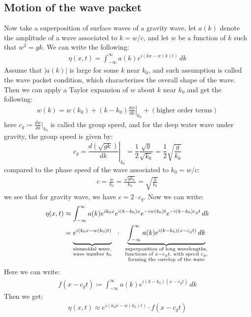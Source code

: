 \documentclass[11pt]{book}
\theoremstyle{break}
\theoremstyle{break}
\begin{document}
\subsection{Motion of the wave packet}
Now take a superposition of surface waves of a gravity wave, let $a(k)$ denote the amplitude of a wave associated to $k = w/c$, and let $w$ be a function of $k$ such that $w^2 = gk$. We can write the following:
\begin{align*}
\eta(x,t) = \int_{-\infty}^\infty a(k) e^{i(kx-w(k)t) }\, dk
\end{align*}
Assume that $|a(k)|$ is large for some $k$ near $k_0$, and such assumption is called the wave packet condition, which characterizes the overall shape of the wave. Then we can apply a Taylor expansion of $w$ about $k$ near $k_0$ and get the following:
\begin{align*}
w(k) = w(k_0) + (k-k_0) \left.\frac{dw}{dk}\right|_{k_0} +( \text{higher order terms})
\end{align*}
here $c_g \coloneqq \frac{dw}{dk}|_{k_0}$ is called the group speed, and for the deep water wave under gravity, the group speed is given by: 
$$c_g = \left.\frac{d(\sqrt{gk})}{dk}\right|_{k_0} = \frac{1}{2}\frac{\sqrt{g}}{\sqrt{k_0}} = \frac{1}{2}\sqrt{\frac{g}{k_0}}$$
compared to the phase speed of the wave associated to $k_0 = w/ c$:
\begin{align*}
c = \frac{w}{k_0} = \frac{\sqrt{gk_0}}{k_0} = \sqrt{\frac{g}{k_0}}
\end{align*} 
we see that for gravity wave, we have $c=2\cdot c_g$. 
Now we can write:
\begin{align*}
\eta(x,t) &\approx \int_{-\infty}^\infty a(k) e^{ik_0x} e^{i(k-k_0)x} e^{-iw(k_0)t} e^{-i(k-k_0)c_g t}\, dk\\
&=\underbrace{\vphantom{\int_{-\infty}^\infty a(k)}e^{i(k_0x-w(k_0)t)}}_{\substack{\text{sinusoidal wave,}\\ \text{wave number }k_0}} \ \ \cdot \ \  \underbrace{ \int_{-\infty}^\infty a(k) e^{i(k-k_0)(x-c_g t)}\, dk}_{\substack{\text{superposition of long wavelengths,}\\ \text{functions of }x-c_gt, \text{ with speed }c_g, \\ \text{forming the envelop of the wave}}}
\end{align*}
Here we can write:
\begin{align*}
f(x-c_g t) \coloneqq \int_{-\infty}^\infty a(k) e^{i(k-k_0)(x-c_g t)}\, dk
\end{align*}
Then we get:
\begin{align*}
\eta(x,t) \approx e^{i(k_0x-w(k_0)t)} \cdot f(x-c_g t)
\end{align*}
\end{document}
